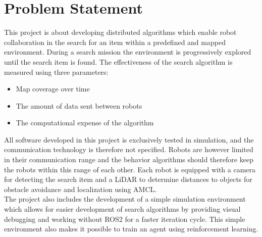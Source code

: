\section{Problem Statement}
\label{sec:problem-statement}

This project is about developing distributed algorithms which enable robot collaboration in the search for an item within a predefined and mapped environment. During a search mission the environment is progressively explored until the search item is found. The effectiveness of the search algorithm is measured using {\color{red} three} parameters:

\begin{itemize}
    \item Map coverage over time
    \item The amount of data sent between robots
    \item The computational expense of the algorithm
\end{itemize}

All software developed in this project is exclusively tested in simulation, and the communication technology is therefore not specified. Robots are however limited in their communication range and the behavior algorithms should therefore keep the robots within this range of each other. Each robot is equipped with a camera for detecting the search item and a LiDAR to determine distances to objects for obstacle avoidance and localization using AMCL. \\

The project also includes the development of a simple simulation environment which allows for easier development of search algorithms by providing visual debugging and working without ROS2 for a faster iteration cycle. This simple environment also makes it possible to train an agent using reinforcement learning.
